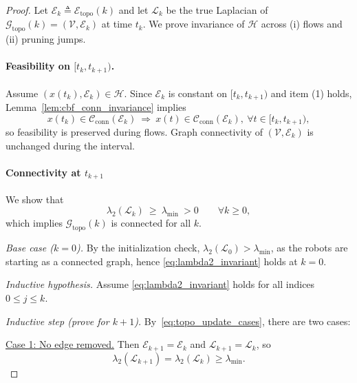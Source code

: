 \documentclass[conference]{IEEEconf}
\theoremstyle{plain}
\begin{document}
\begin{proof}
Let $\mathcal{E}_k\triangleq\mathcal{E}_{\mathrm{topo}}(k)$ and let $\mathcal{L}_k$ be the true Laplacian of
$\mathcal{G}_{\mathrm{topo}}(k)=(\mathcal{V},\mathcal{E}_k)$ at time $t_k$.
We prove invariance of $\mathcal{H}$ across (i) flows and (ii) pruning jumps.

\paragraph{Feasibility on $[t_k,t_{k+1})$.}
Assume $(x(t_k),\mathcal{E}_k)\in\mathcal{H}$.
Since $\mathcal{E}_k$ is constant on $[t_k,t_{k+1})$ and item (1) holds,
Lemma~\ref{lem:cbf_conn_invariance} implies
\begin{equation}
x(t_k)\in\mathcal{C}_{\mathrm{conn}}(\mathcal{E}_k)\ \Longrightarrow\
x(t)\in\mathcal{C}_{\mathrm{conn}}(\mathcal{E}_k),\ \forall t\in[t_k,t_{k+1}),
\label{eq:flow_feas}
\end{equation}
so feasibility is preserved during flows. Graph connectivity of $(\mathcal{V},\mathcal{E}_k)$ is unchanged during the interval.

\paragraph{Connectivity at $t_{k+1}$}
We show that
\begin{equation}
\lambda_2(\mathcal{L}_k)\ \ge\ \lambda_{\min}\ >0 \qquad \forall k\ge 0,
\label{eq:lambda2_invariant}
\end{equation}
which implies $\mathcal{G}_{\mathrm{topo}}(k)$ is connected for all $k$.

\emph{Base case ($k=0$).}
By the initialization check, $\lambda_2(\mathcal{L}_0)>\lambda_{\min}$, as the robots are starting as a connected graph, hence \eqref{eq:lambda2_invariant} holds at $k=0$.

\emph{Inductive hypothesis.}
Assume \eqref{eq:lambda2_invariant} holds for all indices $0\le j\le k$.

\emph{Inductive step (prove for $k+1$).}
By~\eqref{eq:topo_update_cases}, there are two cases:

\smallskip
\noindent\underline{Case 1: No edge removed.}
Then $\mathcal{E}_{k+1}=\mathcal{E}_k$ and $\mathcal{L}_{k+1}=\mathcal{L}_k$, so
\[
\lambda_2(\mathcal{L}_{k+1})=\lambda_2(\mathcal{L}_k)\ge \lambda_{\min}.
\]


\end{proof}
\end{document}
